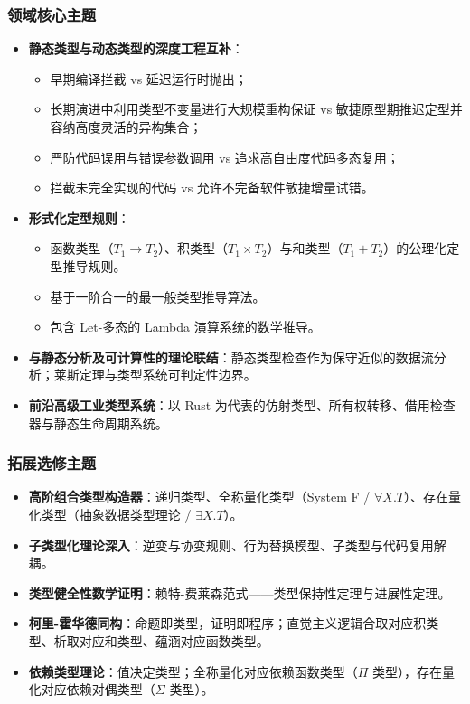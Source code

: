 \subsubsection{领域核心主题}
\begin{itemize}
    \item \textbf{静态类型与动态类型的深度工程互补}：
    \begin{itemize}
        \item 早期编译拦截 vs 延迟运行时抛出；
        \item 长期演进中利用类型不变量进行大规模重构保证 vs 敏捷原型期推迟定型并容纳高度灵活的异构集合；
        \item 严防代码误用与错误参数调用 vs 追求高自由度代码多态复用；
        \item 拦截未完全实现的代码 vs 允许不完备软件敏捷增量试错。
    \end{itemize}
    \item \textbf{形式化定型规则}：
    \begin{itemize}
        \item 函数类型（$T_1 \to T_2$）、积类型（$T_1 \times T_2$）与和类型（$T_1 + T_2$）的公理化定型推导规则。
        \item 基于一阶合一的最一般类型推导算法。
        \item 包含 Let-多态的 Lambda 演算系统的数学推导。
    \end{itemize}
    \item \textbf{与静态分析及可计算性的理论联结}：静态类型检查作为保守近似的数据流分析；莱斯定理与类型系统可判定性边界。
    \item \textbf{前沿高级工业类型系统}：以 Rust 为代表的仿射类型、所有权转移、借用检查器与静态生命周期系统。
\end{itemize}

\subsubsection{拓展选修主题}
\begin{itemize}
    \item \textbf{高阶组合类型构造器}：递归类型、全称量化类型（System F / $\forall X. T$）、存在量化类型（抽象数据类型理论 / $\exists X. T$）。
    \item \textbf{子类型化理论深入}：逆变与协变规则、行为替换模型、子类型与代码复用解耦。
    \item \textbf{类型健全性数学证明}：赖特-费莱森范式——类型保持性定理与进展性定理。
    \item \textbf{柯里-霍华德同构}：命题即类型，证明即程序；直觉主义逻辑合取对应积类型、析取对应和类型、蕴涵对应函数类型。
    \item \textbf{依赖类型理论}：值决定类型；全称量化对应依赖函数类型（$\Pi$ 类型），存在量化对应依赖对偶类型（$\Sigma$ 类型）。
\end{itemize}

